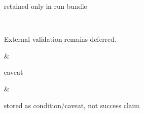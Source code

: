 {\begin{longtable}
\begin{minipage}[t]{\linewidth}
retained only in run bundle
\end{minipage} \\
\hline
\begin{minipage}[t]{\linewidth}\RaggedRight\hspace{0pt}
External validation remains deferred.
\end{minipage} & \begin{minipage}[t]{\linewidth}\RaggedRight\hspace{0pt}
caveat
\end{minipage} & \begin{minipage}[t]{\linewidth}\RaggedRight\hspace{0pt}
stored as condition/\allowbreak{}caveat, not success claim
\end{minipage} \\
\end{longtable}
}
